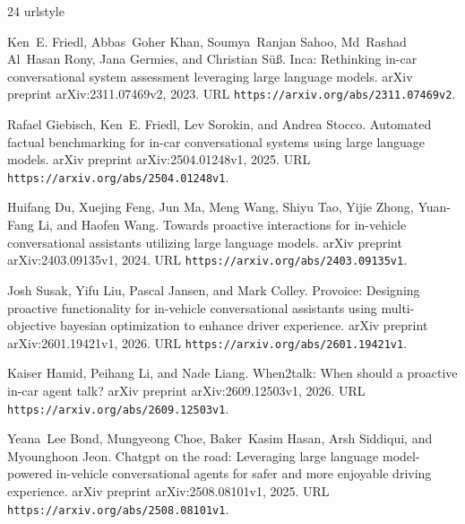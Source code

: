 \documentclass[11pt,a4paper]{article}
\begin{document}
\begin{thebibliography}{24}
\providecommand{\natexlab}[1]{#1}
\providecommand{\url}[1]{\texttt{#1}}
\expandafter\ifx\csname urlstyle\endcsname\relax
  \providecommand{\doi}[1]{doi: #1}\else
  \providecommand{\doi}{doi: \begingroup \urlstyle{rm}\Url}\fi

Ken~E. Friedl, Abbas~Goher Khan, Soumya~Ranjan Sahoo, Md~Rashad Al~Hasan Rony,
  Jana Germies, and Christian Süß.
\newblock Inca: Rethinking in-car conversational system assessment leveraging
  large language models.
\newblock arXiv preprint arXiv:2311.07469v2, 2023.
\newblock URL \url{https://arxiv.org/abs/2311.07469v2}.

Rafael Giebisch, Ken~E. Friedl, Lev Sorokin, and Andrea Stocco.
\newblock Automated factual benchmarking for in-car conversational systems
  using large language models.
\newblock arXiv preprint arXiv:2504.01248v1, 2025.
\newblock URL \url{https://arxiv.org/abs/2504.01248v1}.

Huifang Du, Xuejing Feng, Jun Ma, Meng Wang, Shiyu Tao, Yijie Zhong, Yuan-Fang
  Li, and Haofen Wang.
\newblock Towards proactive interactions for in-vehicle conversational
  assistants utilizing large language models.
\newblock arXiv preprint arXiv:2403.09135v1, 2024.
\newblock URL \url{https://arxiv.org/abs/2403.09135v1}.

Josh Susak, Yifu Liu, Pascal Jansen, and Mark Colley.
\newblock Provoice: Designing proactive functionality for in-vehicle
  conversational assistants using multi-objective bayesian optimization to
  enhance driver experience.
\newblock arXiv preprint arXiv:2601.19421v1, 2026.
\newblock URL \url{https://arxiv.org/abs/2601.19421v1}.

Kaiser Hamid, Peihang Li, and Nade Liang.
\newblock When2talk: When should a proactive in-car agent talk?
\newblock arXiv preprint arXiv:2609.12503v1, 2026.
\newblock URL \url{https://arxiv.org/abs/2609.12503v1}.

Yeana~Lee Bond, Mungyeong Choe, Baker~Kasim Hasan, Arsh Siddiqui, and
  Myounghoon Jeon.
\newblock Chatgpt on the road: Leveraging large language model-powered
  in-vehicle conversational agents for safer and more enjoyable driving
  experience.
\newblock arXiv preprint arXiv:2508.08101v1, 2025.
\newblock URL \url{https://arxiv.org/abs/2508.08101v1}.


\end{thebibliography}
\end{document}
